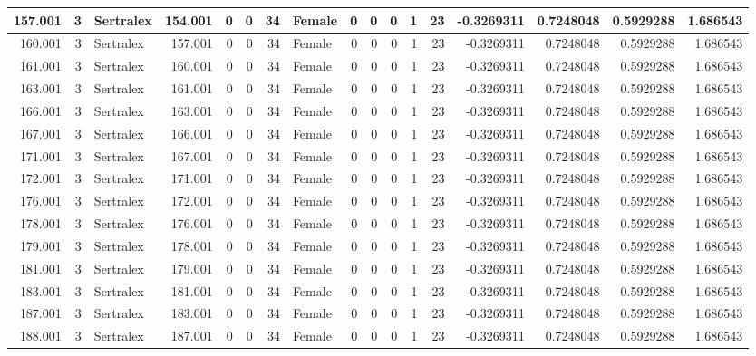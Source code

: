 \documentclass[
]{book}
\begin{document}
\begin{table}
\begin{tabular}[t]{r|r|l|r|r|r|r|l|r|r|r|r|r|r|r|r|r}
\hline
157.001 & 3 & Sertralex & 154.001 & 0 & 0 & 34 & Female & 0 & 0 & 0 & 1 & 23 & -0.3269311 & 0.7248048 & 0.5929288 & 1.686543\\
\hline
160.001 & 3 & Sertralex & 157.001 & 0 & 0 & 34 & Female & 0 & 0 & 0 & 1 & 23 & -0.3269311 & 0.7248048 & 0.5929288 & 1.686543\\
\hline
161.001 & 3 & Sertralex & 160.001 & 0 & 0 & 34 & Female & 0 & 0 & 0 & 1 & 23 & -0.3269311 & 0.7248048 & 0.5929288 & 1.686543\\
\hline
163.001 & 3 & Sertralex & 161.001 & 0 & 0 & 34 & Female & 0 & 0 & 0 & 1 & 23 & -0.3269311 & 0.7248048 & 0.5929288 & 1.686543\\
\hline
166.001 & 3 & Sertralex & 163.001 & 0 & 0 & 34 & Female & 0 & 0 & 0 & 1 & 23 & -0.3269311 & 0.7248048 & 0.5929288 & 1.686543\\
\hline
167.001 & 3 & Sertralex & 166.001 & 0 & 0 & 34 & Female & 0 & 0 & 0 & 1 & 23 & -0.3269311 & 0.7248048 & 0.5929288 & 1.686543\\
\hline
171.001 & 3 & Sertralex & 167.001 & 0 & 0 & 34 & Female & 0 & 0 & 0 & 1 & 23 & -0.3269311 & 0.7248048 & 0.5929288 & 1.686543\\
\hline
172.001 & 3 & Sertralex & 171.001 & 0 & 0 & 34 & Female & 0 & 0 & 0 & 1 & 23 & -0.3269311 & 0.7248048 & 0.5929288 & 1.686543\\
\hline
176.001 & 3 & Sertralex & 172.001 & 0 & 0 & 34 & Female & 0 & 0 & 0 & 1 & 23 & -0.3269311 & 0.7248048 & 0.5929288 & 1.686543\\
\hline
178.001 & 3 & Sertralex & 176.001 & 0 & 0 & 34 & Female & 0 & 0 & 0 & 1 & 23 & -0.3269311 & 0.7248048 & 0.5929288 & 1.686543\\
\hline
179.001 & 3 & Sertralex & 178.001 & 0 & 0 & 34 & Female & 0 & 0 & 0 & 1 & 23 & -0.3269311 & 0.7248048 & 0.5929288 & 1.686543\\
\hline
181.001 & 3 & Sertralex & 179.001 & 0 & 0 & 34 & Female & 0 & 0 & 0 & 1 & 23 & -0.3269311 & 0.7248048 & 0.5929288 & 1.686543\\
\hline
183.001 & 3 & Sertralex & 181.001 & 0 & 0 & 34 & Female & 0 & 0 & 0 & 1 & 23 & -0.3269311 & 0.7248048 & 0.5929288 & 1.686543\\
\hline
187.001 & 3 & Sertralex & 183.001 & 0 & 0 & 34 & Female & 0 & 0 & 0 & 1 & 23 & -0.3269311 & 0.7248048 & 0.5929288 & 1.686543\\
\hline
188.001 & 3 & Sertralex & 187.001 & 0 & 0 & 34 & Female & 0 & 0 & 0 & 1 & 23 & -0.3269311 & 0.7248048 & 0.5929288 & 1.686543\\

\end{tabular}
\end{table}
\end{document}
